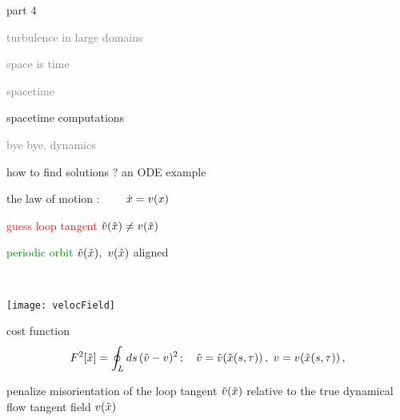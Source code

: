 \begin{frame}{part 4}
\begin{enumerate}
              \item
    \textcolor{gray}{\small
turbulence in large domains
              \item
space is time
              \item
spacetime    }
              \item {\Large
spacetime computations
    }\textcolor{gray}{\small
              \item
bye bye, dynamics
                    }
            \end{enumerate}
\end{frame}


\begin{frame}{how to find solutions ? an ODE example}
\begin{center}
the law of motion : $\qquad \dot{x} = v(x)$
\begin{minipage}[c]{0.55\textwidth}
\textcolor{red}{guess loop tangent}
$\tilde{v}(\tilde{x})
	\neq
v(\tilde{x})$

	\vskip 0.5cm

\textcolor{green}{periodic orbit}
$\tilde{v}(\tilde{x})$,~$v(\tilde{x})$
aligned
\end{minipage}%
~~~~~~~\begin{minipage}[c]{0.40\textwidth}
	\begin{center}
	\texttt{[image: velocField]}
	\end{center}
\end{minipage}
\end{center}
\begin{block}{cost function}%
\[
F^2[\tilde{x}] =
            \oint_L ds\,(\tilde{v}-v)^2
    \,;\quad
    \tilde{v} = \tilde{v}(\tilde{x}(s,\tau))\,,\,\,
    v = v(\tilde{x}(s,\tau))
\,,
\]
\end{block}
\bigskip

penalize%
 misorientation of the loop tangent
$\tilde{v}(\tilde{x})$
relative to the true dynamical flow tangent field $v(\tilde{x})$
\end{frame}

